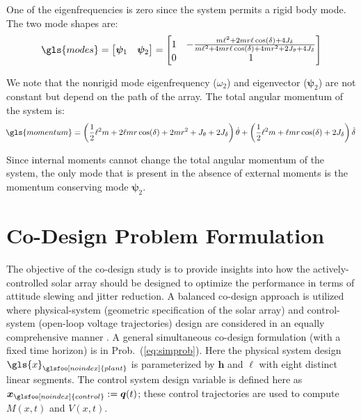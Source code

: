 \noindent One of the eigenfrequencies is zero since the system permits a rigid body mode. The two mode shapes are:
\begin{align}
\gls{modes} = \begin{bmatrix}
\bm{\psi}_1 & \bm{\psi}_2 
\end{bmatrix} = \begin{bmatrix}
1 & -\frac{m \ell^2 + 2 m r \ell \cos(\delta)  + 4 J_{\delta}}{m \ell^2 + 4 m r \ell \cos(\delta) + 4 m r^2 + 2 J_{\theta} + 4 J_{\delta}} \\ 0 & 1
\end{bmatrix}
\end{align}

\noindent We note that the nonrigid mode eigenfrequency ($\omega_2$) and eigenvector ($\bm{\psi}_2$) are not constant but depend on the path of the array. The total angular momentum of the system is:
\begin{align}
\hspace{-0.5ex}\gls{momentum}= \left( \frac{1}{2} \ell^2 m +  2 \ell m r \cos(\delta) + 2mr^2 + J_\theta + 2J_\delta  \right) \dot{\theta} + \left( \frac{1}{2} \ell^2 m + \ell m r \cos(\delta) + 2J_\delta \right)  \dot{\delta} \label{eq:ch7:momentum}
\end{align}

\noindent Since internal moments cannot change the total angular momentum of the system, the only mode that is present in the absence of external moments is the momentum conserving mode $\bm{\psi}_2$.

\section{Co-Design Problem Formulation \label{sec:ch7:formulation}}

The objective of the co-design study is to provide insights into how the actively-controlled solar array should be designed to optimize the performance in terms of attitude slewing and jitter reduction. A balanced co-design approach is utilized where physical-system (geometric specification of the solar array) and control-system (open-loop voltage trajectories) design are considered in an equally comprehensive manner \cite{Allison2014b}. A general simultaneous co-design formulation (with a fixed time horizon) is in Prob.~(\ref{eq:simprob}).
Here the physical system design $\gls{x}_{\glsfoo[noindex]{plant}}$ is parameterized by $\bm{h}$ and $\bm{\ell}$ with eight distinct linear segments. The control system design variable is defined here as $\bm{x}_{\glsfoo[noindex]{control}} := \bm{q}(t)$; these control trajectories are used to compute $M(x,t)$ and $V(x,t)$.


